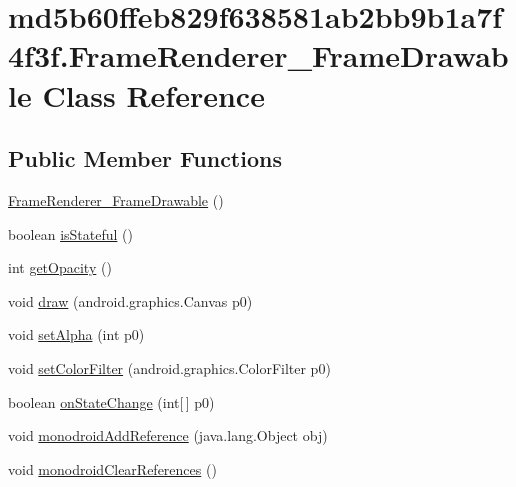 \hypertarget{classmd5b60ffeb829f638581ab2bb9b1a7f4f3f_1_1_frame_renderer___frame_drawable}{
\section{md5b60ffeb829f638581ab2bb9b1a7f4f3f.FrameRenderer\_\-FrameDrawable Class Reference}
\label{classmd5b60ffeb829f638581ab2bb9b1a7f4f3f_1_1_frame_renderer___frame_drawable}
}
\subsection*{Public Member Functions}
\begin{CompactItemize}
\item 
\hyperlink{classmd5b60ffeb829f638581ab2bb9b1a7f4f3f_1_1_frame_renderer___frame_drawable_f5152f9b53fd5e2264906592723a537c}{FrameRenderer\_\-FrameDrawable} ()
\item 
boolean \hyperlink{classmd5b60ffeb829f638581ab2bb9b1a7f4f3f_1_1_frame_renderer___frame_drawable_15f493423661d5ca5f2234354f2bbe60}{isStateful} ()
\item 
int \hyperlink{classmd5b60ffeb829f638581ab2bb9b1a7f4f3f_1_1_frame_renderer___frame_drawable_5df734132fa9dce2008522823ef7afea}{getOpacity} ()
\item 
void \hyperlink{classmd5b60ffeb829f638581ab2bb9b1a7f4f3f_1_1_frame_renderer___frame_drawable_9ae4e1d83787ace020a310e859ec2991}{draw} (android.graphics.Canvas p0)
\item 
void \hyperlink{classmd5b60ffeb829f638581ab2bb9b1a7f4f3f_1_1_frame_renderer___frame_drawable_0983b0e2e739552d0107ee9706e4db1a}{setAlpha} (int p0)
\item 
void \hyperlink{classmd5b60ffeb829f638581ab2bb9b1a7f4f3f_1_1_frame_renderer___frame_drawable_be5f6da6b637ce39a4d7b5e6511d6bab}{setColorFilter} (android.graphics.ColorFilter p0)
\item 
boolean \hyperlink{classmd5b60ffeb829f638581ab2bb9b1a7f4f3f_1_1_frame_renderer___frame_drawable_f656885886f20aabde150e4a22d00078}{onStateChange} (int\mbox{[}$\,$\mbox{]} p0)
\item 
void \hyperlink{classmd5b60ffeb829f638581ab2bb9b1a7f4f3f_1_1_frame_renderer___frame_drawable_e85a373d5c3c24552469e123a6b98caa}{monodroidAddReference} (java.lang.Object obj)
\item 
void \hyperlink{classmd5b60ffeb829f638581ab2bb9b1a7f4f3f_1_1_frame_renderer___frame_drawable_cda69c0c39f5939c5e97153945c34cf6}{monodroidClearReferences} ()
\end{CompactItemize}
